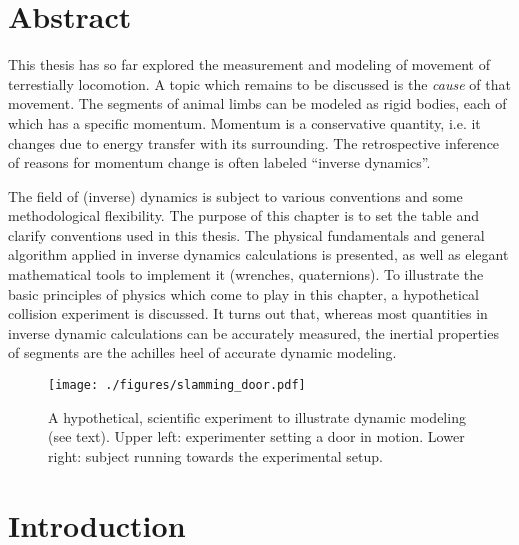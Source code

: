 \clearpage


\section{Abstract}
\label{sec:org8d817cf}
This thesis has so far explored the measurement and modeling of movement of terrestially locomotion.
A topic which remains to be discussed is the \emph{cause} of that movement.
The segments of animal limbs can be modeled as rigid bodies, each of which has a specific momentum.
Momentum is a conservative quantity, i.e. it changes due to energy transfer with its surrounding.
The retrospective inference of reasons for momentum change is often labeled ``inverse dynamics''.

The field of (inverse) dynamics is subject to various conventions and some methodological flexibility.
The purpose of this chapter is to set the table and clarify conventions used in this thesis.
The physical fundamentals and general algorithm applied in inverse dynamics calculations is presented, as well as elegant mathematical tools to implement it (wrenches, quaternions).
To illustrate the basic principles of physics which come to play in this chapter, a hypothetical collision experiment is discussed.
It turns out that, whereas most quantities in inverse dynamic calculations can be accurately measured, the inertial properties of segments are the achilles heel of accurate dynamic modeling.


\clearpage

\begin{figure}[htbp]
\centering
\texttt{[image: ./figures/slamming\_door.pdf]}
\caption{\label{fig:slamming}A hypothetical, scientific experiment to illustrate dynamic modeling (see text). Upper left: experimenter setting a door in motion. Lower right: subject running towards the experimental setup.}
\end{figure}


\section{Introduction}
\label{sec:orge4dae22}
